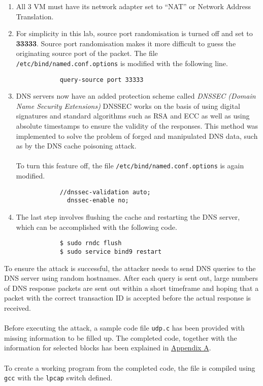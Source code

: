 \documentclass[a4paper,12pt]{article}
\begin{document}
		\begin{enumerate}
			\itemsep0em
			\item All 3 VM must have its network adapter set to ``NAT'' or Network Address Translation.
			\item For simplicity in this lab, source port randomisation is turned off and set to \textbf{33333}. Source port randomisation makes it more difficult to guess the originating source port of the packet. The file \texttt{/etc/bind/named.conf.options} is modified with the following line.
			\begin{verbatim}
			query-source port 33333
			\end{verbatim}
			\item DNS servers now have an added protection scheme called \textit{DNSSEC (Domain Name Security Extensions)} DNSSEC works on the basis of using digital signatures and standard algorithms such as RSA and ECC as well as using absolute timestamps to ensure the validity of the responses. This method was implemented to solve the problem of forged and manipulated DNS data, such as by the DNS cache poisoning attack.\\\\To turn this feature off, the file \texttt{/etc/bind/named.conf.options} is again modified.
			\begin{verbatim}
			//dnssec-validation auto;
			  dnssec-enable no;
			\end{verbatim}
			\item The last step involves flushing the cache and restarting the DNS server, which can be accomplished with the following code.
			\begin{verbatim}
			$ sudo rndc flush
			$ sudo service bind9 restart
			\end{verbatim}
		\end{enumerate}
		To ensure the attack is successful, the attacker needs to send DNS queries to the DNS server using random hostnames. After each query is sent out, large numbers of DNS response packets are sent out within a short timeframe and hoping that a packet with the correct transaction ID is accepted before the actual response is received.\\\\Before executing the attack, a sample code file \texttt{udp.c} has been provided with missing information to be filled up. The completed code, together with the information for selected blocks has been explained in \hyperref[AppA]{Appendix A}.
		\\\\To create a working program from the completed code, the file is compiled using \texttt{gcc} with the \texttt{lpcap} switch defined.
\end{document}
